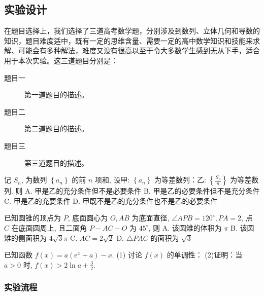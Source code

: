 \subsection{实验设计}
在题目选择上，我们选择了三道高考数学题，分别涉及到数列、立体几何和导数的知识，题目难度适中，既有一定的思维含量、需要一定的高中数学知识和技能来求解、可能会有多种解法，难度又没有很高以至于令大多数学生感到无从下手，适合用于本次实验。这三道题目分别是：

\begin{description}
    \item[题目一] 第一道题目的描述。
    \item[题目二] 第二道题目的描述。
    \item[题目三] 第三道题目的描述。
\end{description}

记 $S_n$, 为数列 $\left\{a_n\right\}$ 的前 $n$ 项和, 设甲: $\left\{a_n\right\}$ 为等差数列：乙: $\left\{\frac{S_n}{n}\right\}$ 为等差数列. 则
A. 甲是乙的充分条件但不是必要条件
B. 甲是乙的必要条件但不是充分条件
C. 甲是乙的充要条件
D. 甲既不是乙的充分条件也不是乙的必要条件


已知圆锥的顶点为 $P$, 底面圆心为 $O, A B$ 为底面直径, $\angle A P B=120^{\circ}, P A=2$, 点 $C$ 在底面圆周上, 且二面角 $P-A C-O$ 为 $45^{\circ}$, 则
A. 该圆雉的体积为 $\pi$
B. 该圆雉的侧面积为 $4 \sqrt{3} \pi$
C. $A C=2 \sqrt{2}$
D. $\triangle P A C$ 的面积为 $\sqrt{3}$


已知函数 $f(x)=a\left(\mathrm{e}^x+a\right)-x$.
(1) 讨论 $f(x)$ 的单调性：
(2)证明：当 $a>0$ 时, $f(x)>2 \ln a+\frac{3}{2}$.

\subsubsection{实验流程}